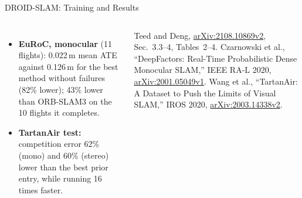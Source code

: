 \begin{frame}{DROID-SLAM: Training and Results}
\begin{columns}[T,onlytextwidth]
      \vspace{0.3em}
      \begin{itemize}\scriptsize\itemsep0.25em
        \item \textbf{EuRoC, monocular} (11 flights): 0.022\,m mean ATE against 0.126\,m for the best method without failures (82\% lower); 43\% lower than ORB-SLAM3 on the 10 flights it completes.
        \item \textbf{TartanAir test:} competition error 62\% (mono) and 60\% (stereo) lower than the best prior entry, while running 16 times faster.
      \end{itemize}
      \vspace{0.2em}
      {\scriptsize Teed and Deng, \href{https://arxiv.org/abs/2108.10869v2}{arXiv:2108.10869v2}, Sec.~3.3--4, Tables~2--4. Czarnowski et al., ``DeepFactors: Real-Time Probabilistic Dense Monocular SLAM,'' IEEE RA-L 2020, \href{https://arxiv.org/abs/2001.05049v1}{arXiv:2001.05049v1}. Wang et al., ``TartanAir: A Dataset to Push the Limits of Visual SLAM,'' IROS 2020, \href{https://arxiv.org/abs/2003.14338v2}{arXiv:2003.14338v2}.\par}
  \end{columns}
\end{frame}

